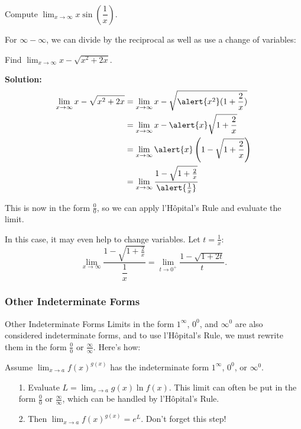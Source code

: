 \documentclass[cal1spr16Lectures.tex]{subfiles}
\begin{document}
\begin{frame}%
\frametitle{}
\small
\begin{exe} Compute $\displaystyle\lim_{x \to \infty} x \sin \left( \dfrac{1}{x} \right).$ \end{exe}
\end{frame}

\begin{frame}
\footnotesize
For $\infty - \infty$, we can divide by the reciprocal as well as use a change of variables:
\begin{ex} Find $\displaystyle\lim_{x \to \infty} x-\sqrt{x^2+2x}$. \end{ex}
{\bf Solution:}
\vspace{-1.5pc}
\begin{alignat*}{2}
\lim_{x \to \infty} x-\sqrt{x^2+2x} &= \lim_{x \to \infty} x-\sqrt{\alert{x^2}(1+\frac{2}{x})} \\%
&=\lim_{x \to \infty} x-\alert{x}\sqrt{1+\frac{2}{x}} \\
&= \lim_{x \to \infty} \alert{x} \left( 1-\sqrt{1+\frac{2}{x}} \right) \\
&= \lim_{x \to \infty} \frac{ 1-\sqrt{1+\frac{2}{x}} }{\alert{\frac{1}{x}} }
\end{alignat*}
\end{frame}

\begin{frame}
\small
This is now in the form $\frac{0}{0}$, so we can apply l'H\^{o}pital's Rule and evaluate the limit.  

\vspace{1pc} 
In this case, it may even help to change variables.  Let $t=\frac{1}{x}$:
\[\lim_{x \to \infty} \frac{ 1-\sqrt{1+\frac{2}{x}} }{\dfrac{1}{x} } = \lim_{t \to 0^+} \frac{1-\sqrt{1+2t}}{t}.\]
\end{frame}

\subsubsection{Other Indeterminate Forms}

\begin{frame}{\small Other Indeterminate Forms}
\footnotesize
Limits in the form $1^{\infty}$, $0^0$, and $\infty^0$ are also considered indeterminate forms, and to use l'H\^{o}pital's Rule, we must rewrite them in the form $\frac{0}{0}$ or $\frac{\infty}{\infty}$.  Here's how:

\vspace{1pc}
Assume $\displaystyle\lim_{x \to a} f(x)^{g(x)}$ has the indeterminate form $1^{\infty}$, $0^0$, or $\infty^0$.
\begin{itemize}
\item[1.] Evaluate $L=\displaystyle\lim_{x \to a} g(x) \ln f(x)$.  This limit can often be put in the form $\frac{0}{0}$ or $\frac{\infty}{\infty}$, which can be handled by l'H\^{o}pital's Rule.
\item[2.] Then $\displaystyle\lim_{x \to a} f(x)^{g(x)}=e^L$. \alert{Don't forget this step!}
\end{itemize}
\end{frame}
\end{document}
